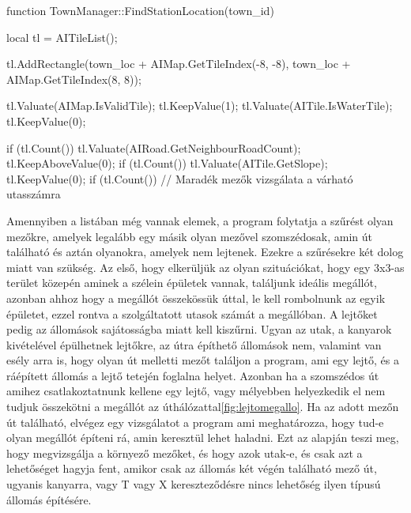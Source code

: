 \begin{cpp}
function TownManager::FindStationLocation(town_id) {
  local tl = AITileList();
  
  tl.AddRectangle(town_loc + AIMap.GetTileIndex(-8, -8),
   town_loc + AIMap.GetTileIndex(8, 8));
   
  tl.Valuate(AIMap.IsValidTile);
  tl.KeepValue(1);
  tl.Valuate(AITile.IsWaterTile);
  tl.KeepValue(0);
  
  if (tl.Count()) {
    tl.Valuate(AIRoad.GetNeighbourRoadCount);
  	tl.KeepAboveValue(0);
  	if (tl.Count()) {
      tl.Valuate(AITile.GetSlope);
      tl.KeepValue(0);
      if (tl.Count()) {
      	// Maradék mezők vizsgálata a várható utasszámra
      }
    }
  }
}
\end{cpp}

Amennyiben a listában még vannak elemek, a program folytatja a szűrést olyan mezőkre, amelyek legalább egy másik olyan mezővel szomszédosak, amin út található és aztán olyanokra, amelyek nem lejtenek. Ezekre a szűrésekre két dolog miatt van szükség. Az első, hogy elkerüljük az olyan szituációkat, hogy egy 3x3-as terület közepén aminek a szélein épületek vannak, találjunk ideális megállót, azonban ahhoz hogy a megállót összekössük úttal, le kell rombolnunk az egyik épületet, ezzel rontva a szolgáltatott utasok számát a megállóban. A lejtőket pedig az állomások sajátosságba miatt kell kiszűrni. Ugyan az utak, a kanyarok kivételével épülhetnek lejtőkre, az útra építhető állomások nem, valamint van esély arra is, hogy olyan út melletti mezőt találjon a program, ami egy lejtő, és a ráépített állomás a lejtő tetején foglalna helyet. Azonban ha a szomszédos út amihez csatlakoztatnunk kellene egy lejtő, vagy mélyebben helyezkedik el nem tudjuk összekötni a megállót az úthálózattal\ref{fig:lejtomegallo}. Ha az adott mezőn út található, elvégez egy vizsgálatot a program ami meghatározza, hogy tud-e olyan megállót építeni rá, amin keresztül lehet haladni. Ezt az alapján teszi meg, hogy megvizsgálja a környező mezőket, és hogy azok utak-e, és csak azt a lehetőséget hagyja fent, amikor csak az állomás két végén található mező út, ugyanis kanyarra, vagy T vagy X kereszteződésre nincs lehetőség ilyen típusú állomás építésére.

